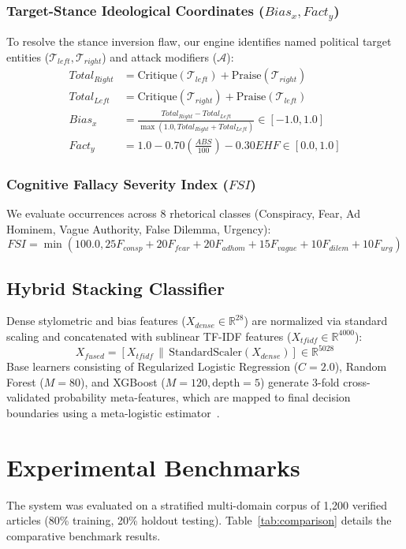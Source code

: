 \documentclass[conference]{IEEEtran}
\begin{document}
\subsubsection{Target-Stance Ideological Coordinates ($Bias_x, Fact_y$)}
To resolve the stance inversion flaw, our engine identifies named political target entities ($\mathcal{T}_{left}, \mathcal{T}_{right}$) and attack modifiers ($\mathcal{A}$):
\begin{align}
Total_{Right} &= \text{Critique}(\mathcal{T}_{left}) + \text{Praise}(\mathcal{T}_{right}) \\
Total_{Left} &= \text{Critique}(\mathcal{T}_{right}) + \text{Praise}(\mathcal{T}_{left}) \\
Bias_x &= \frac{Total_{Right} - Total_{Left}}{\max(1.0, Total_{Right} + Total_{Left})} \in [-1.0, 1.0] \\
Fact_y &= 1.0 - 0.70 \left(\frac{ABS}{100}\right) - 0.30 EHF \in [0.0, 1.0]
\end{align}

\subsubsection{Cognitive Fallacy Severity Index ($FSI$)}
We evaluate occurrences across 8 rhetorical classes (Conspiracy, Fear, Ad Hominem, Vague Authority, False Dilemma, Urgency):
\begin{equation}
FSI = \min(100.0, 25 F_{consp} + 20 F_{fear} + 20 F_{adhom} + 15 F_{vague} + 10 F_{dilem} + 10 F_{urg})
\end{equation}

\subsection{Hybrid Stacking Classifier}
Dense stylometric and bias features ($X_{dense} \in \mathbb{R}^{28}$) are normalized via standard scaling and concatenated with sublinear TF-IDF features ($X_{tfidf} \in \mathbb{R}^{4000}$):
\begin{equation}
X_{fused} = \left[ X_{tfidf} \,\|\, \text{StandardScaler}(X_{dense}) \right] \in \mathbb{R}^{5028}
\end{equation}
Base learners consisting of Regularized Logistic Regression ($C=2.0$), Random Forest ($M=80$), and XGBoost ($M=120, \text{depth}=5$) generate 3-fold cross-validated probability meta-features, which are mapped to final decision boundaries using a meta-logistic estimator~\cite{wolpert1992stacked}.

\section{Experimental Benchmarks}
The system was evaluated on a stratified multi-domain corpus of 1,200 verified articles (80\% training, 20\% holdout testing). Table~\ref{tab:comparison} details the comparative benchmark results.
\end{document}
